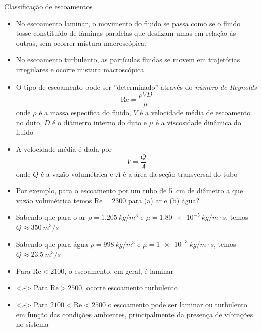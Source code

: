 \documentclass[t,%
brazilian,%
11pt,%
aspectratio=169,%
table%
]{beamer}
\begin{document}


\begin{frame}{Classificação de escoamentos}
    \begin{itemize}
        \item No escoamento laminar, o movimento do fluido se passa como se o
            fluido tosse constituído de lâminas paralelas que deslizam umas em
            relação às outras, sem ocorrer mistura macroscópica.
        \item No escoamento turbulento, as partículas fluidas se movem em
            trajetórias irregulares e ocorre mistura macroscópica
        \item O tipo de escoamento pode ser ''determinado'' através do \textit{número de Reynolds}
            \[
                \text{Re} = \frac{\rho V D}{\mu}
            \]
            onde \(\rho\) é a massa específica do fluido, \(V\) é a velocidade média
            de escoamento no duto, \(D\) é o diâmetro interno do duto e \(\mu\)
            é a viscosidade dinâmica do fluido

        \item A velocidade média é dada por
            \[
                V=\frac{Q}{A}
            \]
            onde \(Q\) é a vazão volumétrica e \(A\) é a área da seção transversal do tubo
    \end{itemize}
\end{frame}

\begin{frame}
    \begin{itemize}
        \item<+-> Por exemplo, para o escoamento por um tubo de \SI{5}{cm} de
            diâmetro a que vazão volumétrica temos \(\text{Re} = 2300\) para (a) ar e
            (b) água?
        \item<+-> Sabendo que para o ar \(\rho=\SI{1.205}{kg/m^3}\) e
            \(\mu = \SI{1.80e-5}{kg/m\cdot s}\), temos \(Q \approx \SI{350}{m^3/s}\)
        \item<+-> Sabendo que para água \(\rho=\SI{998}{kg/m^3}\) e
            \(\mu = \SI{1e-3}{kg/m\cdot s}\), temos \(Q \approx \SI{23.5}{m^3/s}\)

        \item<+-> Para \(\text{Re} < 2100\), o escoamento, em geral, é laminar 

        \item<.-> Para \(\text{Re} > 2500\), ocorre escoamento turbulento

        \item<.-> Para \(2100 < \text{Re} < 2500\) o escoamento pode ser laminar ou
            turbulento em função das condições ambientes, principalmente da
            presença de vibrações no sistema
    \end{itemize}
\end{frame}
\end{document}
